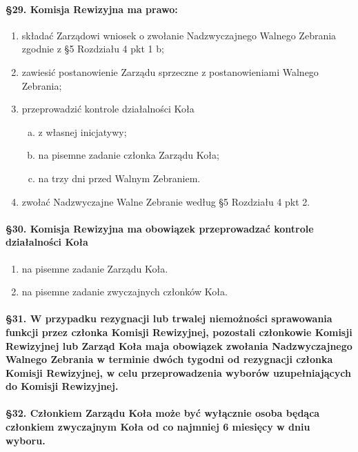 \documentclass{article}
\begin{document}
		\paragraph{\S 29. Komisja Rewizyjna ma prawo:}
		\begin{enumerate}
			\item składać Zarządowi wniosek o zwołanie Nadzwyczajnego Walnego Zebrania zgodnie z §5 Rozdziału 4 pkt 1 b;
			\item zawiesić postanowienie Zarządu sprzeczne z postanowieniami Walnego Zebrania;
			\item przeprowadzić kontrole działalności Koła
			\begin{enumerate}[(a)]
				\item z własnej inicjatywy;
				\item na pisemne zadanie członka Zarządu Koła;
				\item na trzy dni przed Walnym Zebraniem.
			\end{enumerate}
			\item zwołać Nadzwyczajne Walne Zebranie według §5 Rozdziału 4 pkt 2.
		\end{enumerate}
		\paragraph{\S 30. Komisja Rewizyjna ma obowiązek przeprowadzać kontrole działalności Koła}
		\begin{enumerate}
			\item na pisemne zadanie Zarządu Koła.
			\item na pisemne zadanie zwyczajnych członków Koła.
		\end{enumerate}
        \paragraph{\S 31. W przypadku rezygnacji lub trwalej niemożności sprawowania funkcji przez członka Komisji Rewizyjnej, pozostali
                   członkowie Komisji Rewizyjnej lub Zarząd Koła maja obowiązek zwołania Nadzwyczajnego Walnego Zebrania w terminie dwóch tygodni od
                   rezygnacji członka Komisji Rewizyjnej, w celu przeprowadzenia wyborów uzupełniających do Komisji Rewizyjnej.}
		\paragraph{\S 32. Członkiem Zarządu Koła może być wyłącznie osoba będąca członkiem zwyczajnym Koła od co najmniej 6 miesięcy w dniu wyboru.}
\end{document}
